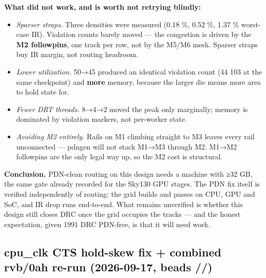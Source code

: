 \begin{record}
\textbf{What did not work, and is worth not retrying blindly:}

\begin{itemize}
\tightlist
\item
  \emph{Sparser straps.} Three densities were measured (0.18 \%, 0.52
  \%, 1.37 \% worst-case IR). Violation counts barely moved --- the
  congestion is driven by the \textbf{M2 followpins}, one track per row,
  not by the M5/M6 mesh. Sparser straps buy IR margin, not routing
  headroom.
\item
  \emph{Lower utilization.}  50→45 produced an
  identical violation count (44 103 at the same checkpoint) and
  \textbf{more} memory, because the larger die means more area to hold
  state for.
\item
  \emph{Fewer DRT threads.} 8→4→2 moved the peak only marginally; memory
  is dominated by violation markers, not per-worker state.
\item
  \emph{Avoiding M2 entirely.} Rails on M1 climbing straight to M3
  leaves every rail unconnected --- pdngen will not stack M1→M3 through
  M2. M1→M2 followpins are the only legal way up, so the M2 cost is
  structural.
\end{itemize}

\textbf{Conclusion.} PDN-clean routing on this design needs a machine
with ≥32 GB, the same gate already recorded for the Sky130 GPU stages.
The PDN fix itself is verified independently of routing: the grid builds
and passes  on CPU, GPU and SoC, and IR drop runs
end-to-end. What remains unverified is whether this design still closes
DRC once the grid occupies the tracks --- and the honest expectation,
given 1991 DRC PDN-free, is that it will need work.

\end{record}

\subsection{\texorpdfstring{cpu\_clk CTS hold-skew fix + combined
rvb/0ah re-run (2026-09-17, beads
//)}{cpu\_clk CTS hold-skew fix + combined rvb/0ah re-run (2026-09-17, beads //)}}\label{cr:run:phase5:cpu-clk-cts-hold-skew-fix-combined-rvb0ah-re-run-2026-09-17-beads-0ahrvbydw}

